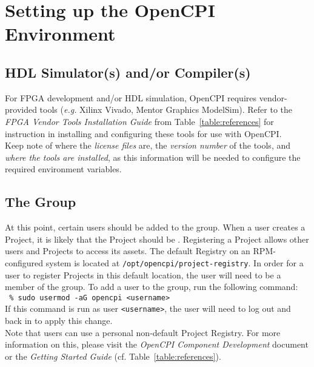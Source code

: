 
\section{Setting up the OpenCPI Environment}
\label{sec:setup_opencpi}
\subsection{HDL Simulator(s) and/or Compiler(s)}
\label{subsec:installing_fpga_vendor}
For FPGA development and/or HDL simulation, OpenCPI requires vendor-provided tools (\textit{e.g.} Xilinx Vivado, Mentor Graphics ModelSim). Refer to the \textit{FPGA Vendor Tools Installation Guide} from Table~\ref{table:references} for instruction in installing and configuring these tools for use with OpenCPI.\\

Keep note of where the \textit{license files} are, the \textit{version number} of the tools, and \textit{where the tools are installed}, as this information will be needed to configure the required environment variables.
\subsection{The  Group}
\label{subsec:opencpi_group}
At this point, certain users should be added to the  group. When a user creates a Project, it is likely that the Project should be . Registering a Project allows other users and Projects to access its assets. The default Registry on an RPM-configured system is located at \verb+/opt/opencpi/project-registry+. In order for a user to register Projects in this default location, the user will need to be a member of the  group. To add a user to the  group, run the following command:\\

\verb+ % sudo usermod -aG opencpi <username>+\\

If this command is run as user \verb+<username>+, the user will need to log out and back in to apply this change.\\

Note that users can use a personal non-default Project Registry. For more information on this, please visit the \textit{OpenCPI Component Development} document or the \textit{Getting Started Guide} (cf. Table~\ref{table:references}).

